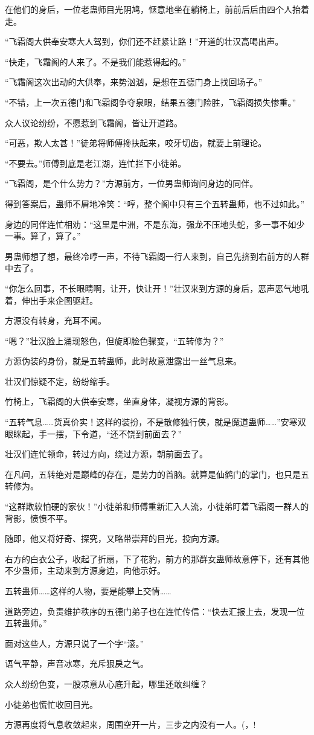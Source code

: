 \begin{this_body}
在他们的身后，一位老蛊师目光阴鸠，惬意地坐在躺椅上，前前后后由四个人抬着走。

“飞霜阁大供奉安寒大人驾到，你们还不赶紧让路！”开道的壮汉高喝出声。

“快走，飞霜阁的人来了。不是我们能惹得起的。”

“飞霜阁这次出动的大供奉，来势汹汹，是想在五德门身上找回场子。”

“不错，上一次五德门和飞霜阁争夺泉眼，结果五德门险胜，飞霜阁损失惨重。”

众人议论纷纷，不愿惹到飞霜阁，皆让开道路。

“可恶，欺人太甚！”徒弟将师傅搀扶起来，咬牙切齿，就要上前理论。

“不要去。”师傅到底是老江湖，连忙拦下小徒弟。

“飞霜阁，是个什么势力？”方源前方，一位男蛊师询问身边的同伴。

得到答案后，蛊师不屑地冷笑：“哼，整个阁中只有三个五转蛊师，也不过如此。”

身边的同伴连忙相劝：“这里是中洲，不是东海，强龙不压地头蛇，多一事不如少一事。算了，算了。”

男蛊师想了想，最终冷哼一声，不待飞霜阁一行人来到，自己先挤到右前方的人群中去了。

“你怎么回事，不长眼睛啊，让开，快让开！”壮汉来到方源的身后，恶声恶气地吼着，伸出手来企图驱赶。

方源没有转身，充耳不闻。

“嗯？”壮汉脸上涌现怒色，但旋即脸色骤变，“五转修为？”

方源伪装的身份，就是五转蛊师，此时故意泄露出一丝气息来。

壮汉们惊疑不定，纷纷缩手。

竹椅上，飞霜阁的大供奉安寒，坐直身体，凝视方源的背影。

“五转气息……货真价实！这样的装扮，不是散修独行侠，就是魔道蛊师……”安寒双眼眯起，手一摆，下令道，“还不饶到前面去？”

壮汉们连忙领命，转过方向，绕过方源，朝前面去了。

在凡间，五转绝对是巅峰的存在，是势力的首脑。就算是仙鹤门的掌门，也只是五转修为。

“这群欺软怕硬的家伙！”小徒弟和师傅重新汇入人流，小徒弟盯着飞霜阁一群人的背影，愤愤不平。

随即，他又将好奇、探究，又略带崇拜的目光，投向方源。

右方的白衣公子，收起了折扇，下了花豹，前方的那群女蛊师故意停下，还有其他不少蛊师，主动来到方源身边，向他示好。

五转蛊师……这样的人物，要是能攀上交情……

道路旁边，负责维护秩序的五德门弟子也在连忙传信：“快去汇报上去，发现一位五转蛊师。”

面对这些人，方源只说了一个字“滚。”

语气平静，声音冰寒，充斥狠戾之气。

众人纷纷色变，一股凉意从心底升起，哪里还敢纠缠？

小徒弟也慌忙收回目光。

方源再度将气息收敛起来，周围空开一片，三步之内没有一人。(，!

\end{this_body}

